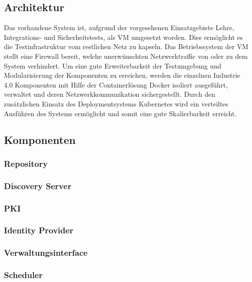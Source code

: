 \subsection{Architektur}
Das vorhandene System ist, aufgrund der vorgesehenen Einsatzgebiete Lehre, Integrations- und Sicherheitstests, als \ac{VM} umgesetzt worden. Dies ermöglicht es die Testinfrastruktur vom restlichen Netz zu kapseln. Das Betriebssystem der \ac{VM} stellt eine Firewall bereit, welche unerwünschten Netzwerktraffic von oder zu dem System verhindert. Um eine gute Erweiterbarkeit der Testumgebung und Modularisierung der Komponenten zu erreichen, werden die einzelnen Industrie 4.0 Komponenten mit Hilfe der Containerlösung Docker isoliert ausgeführt, verwaltet und deren Netzwerkkommunikation sichergestellt. Durch den zusätzlichen Einsatz des Deploymentsystems Kubernetes wird ein verteiltes Ausführen des Systems ermöglicht und somit eine gute Skalierbarkeit erreicht. 

\subsection{Komponenten}

\subsubsection{Repository}
\subsubsection{Discovery Server}
\subsubsection{\ac{PKI}}
\subsubsection{Identity Provider}
\subsubsection{Verwaltungsinterface}
\subsubsection{Scheduler}